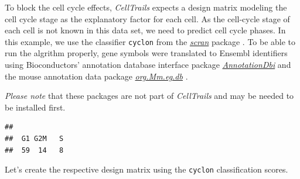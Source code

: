 \documentclass[]{book}
\newenvironment{Shaded}{\begin{snugshade}}{\end{snugshade}}
\newcommand{\KeywordTok}[1]{\textcolor[rgb]{0.13,0.29,0.53}{\textbf{#1}}}
\newcommand{\DataTypeTok}[1]{\textcolor[rgb]{0.13,0.29,0.53}{#1}}
\newcommand{\DecValTok}[1]{\textcolor[rgb]{0.00,0.00,0.81}{#1}}
\newcommand{\StringTok}[1]{\textcolor[rgb]{0.31,0.60,0.02}{#1}}
\newcommand{\CommentTok}[1]{\textcolor[rgb]{0.56,0.35,0.01}{\textit{#1}}}
\newcommand{\OperatorTok}[1]{\textcolor[rgb]{0.81,0.36,0.00}{\textbf{#1}}}
\newcommand{\NormalTok}[1]{#1}
\theoremstyle{definition}
\theoremstyle{definition}
\theoremstyle{definition}
\theoremstyle{remark}
\begin{document}
To block the cell cycle effects, \emph{CellTrails} expects a design
matrix modeling the cell cycle stage as the explanatory factor for each
cell. As the cell-cycle stage of each cell is not known in this data
set, we need to predict cell cycle phases. In this example, we use the
classifier \texttt{cyclon} from the
\emph{\href{http://bioconductor.org/packages/scran}{scran}} package
\citep{scran}. To be able to run the algrithm properly, gene symbols
were translated to Ensembl identifiers using Bioconductors' annotation
database interface package
\emph{\href{http://bioconductor.org/packages/AnnotationDbi}{AnnotationDbi}}
\citep{R-AnnotationDbi} and the mouse annotation data package
\emph{\href{http://bioconductor.org/packages/org.Mm.eg.db}{org.Mm.eg.db}}
\citep{R-Orgmmegdb}.

\emph{Please note} that these packages are not part of \emph{CellTrails}
and may be needed to be installed first.

\begin{Shaded}
\end{Shaded}

\begin{verbatim}
## 
##  G1 G2M   S 
##  59  14   8
\end{verbatim}

Let's create the respective design matrix using the \texttt{cyclon}
classification scores.

\begin{Shaded}
\end{Shaded}
\end{document}
